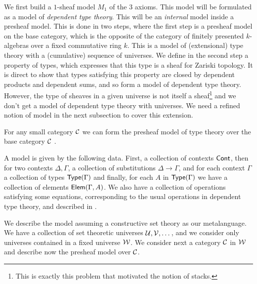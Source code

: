We first build a $1$-sheaf model $M_1$ of the 3 axioms. This model will be formulated as a model of {\em dependent type theory}.
This will be an {\em internal} model inside a presheaf model. This is done in two steps, where the first step is a presheaf model
on the base category, which is the opposite of the category of finitely presented $k$-algebras over a fixed commutative ring $k$.
This is a model of (extensional) type theory with a (cumulative) sequence of universes. We define in the second step a property
of types, which expresses that this type is a sheaf for Zariski topology. It is direct to show that types satisfying this property are
closed by dependent products and dependent sums, and so form a model of dependent type theory.
However, the type of sheaves in a given universe is not itself a sheaf\footnote{This is exactly this problem that motivated the notion
of stacks.} and we don't get a model of dependent type theory with universes. We need a refined notion of model in the next subsection
to cover this extension.

For any small category $\mathcal{C}$ we can form the presheaf model of type theory over the base category $\mathcal{C}$ \cite{hofmann,huber-phd-thesis}.

A model is given by the following data. First, a collection of contexts $\mathsf{Cont}$,
then for two contexts $\Delta,\Gamma$, a collection of substitutions $\Delta\rightarrow\Gamma$, and for each context $\Gamma$
a collection of types $\mathsf{Type}(\Gamma)$ and finally, for each $A$ in $\mathsf{Type}(\Gamma)$ we have a collection of elements
$\mathsf{Elem}(\Gamma,A)$. We also have a collection of operations satisfying some equations, corresponding to the usual operations in
dependent type theory, and described in \cite{huber-phd-thesis}. 

We describe the model assuming a constructive set theory as our metalanguage. We have a collection of set theoretic universes
$\mathcal{U},\mathcal{V},\dots$, and we consider only universes contained in a fixed universe $\mathcal{W}$. We consider next a category $\mathcal{C}$ in $\mathcal{W}$
and describe now the presheaf model over $\mathcal{C}$.

